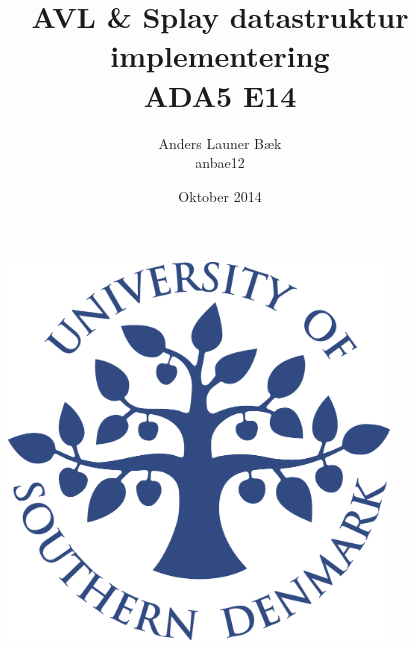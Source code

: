 \title{AVL \& Splay datastruktur implementering \\ ADA5 E14}
\author{Anders Launer Bæk \\ anbae12}
\date{Oktober 2014}
\begin{figure}
\centering
\includegraphics[width=0.9\textwidth]{graphics/forside.png}
\end{figure}
\maketitle
